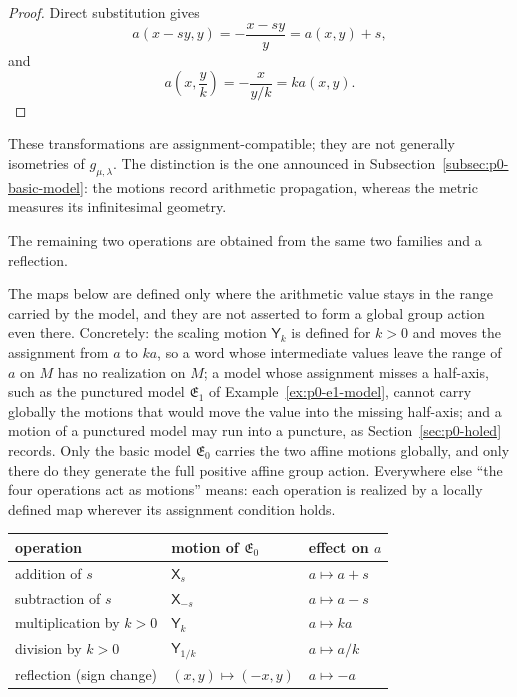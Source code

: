 \begin{proof}
Direct substitution gives
\[
  a(x-sy,y)=-\frac{x-sy}{y}=a(x,y)+s,
\]
and
\[
  a\left(x,\frac yk\right)
  =-\frac{x}{y/k}=k a(x,y).
\]
\end{proof}

These transformations are assignment-compatible; they are not generally
isometries of $g_{\mu,\lambda}$.  The distinction is the one announced in
Subsection~\ref{subsec:p0-basic-model}: the motions record arithmetic
propagation, whereas the metric measures its infinitesimal geometry.

The remaining two operations are obtained from the same two families and a
reflection.

\begin{warning}
\label{warn:p0-partial-motions}
The maps below are defined only where the arithmetic value stays in the range
carried by the model, and they are not asserted to form a global group action
even there.  Concretely: the scaling motion $\mathsf Y_k$ is defined for $k>0$
and moves the assignment from $a$ to $ka$, so a word whose intermediate values
leave the range of $a$ on $M$ has no realization on $M$; a model whose
assignment misses a half-axis, such as the punctured model
$\mathfrak E_1$ of Example~\ref{ex:p0-e1-model}, cannot carry globally the
motions that would move the value into the missing half-axis; and a motion of a
punctured model may run into a puncture, as
Section~\ref{sec:p0-holed} records.  Only the basic model
$\mathfrak E_0$ carries the two affine motions globally, and only there do they
generate the full positive affine group action.  Everywhere else ``the four
operations act as motions'' means: each operation is realized by a locally
defined map wherever its assignment condition holds.
\end{warning}

\begin{center}
\renewcommand{\arraystretch}{1.35}
\begin{tabular}{lll}
\toprule
operation & motion of $\mathfrak E_0$ & effect on $a$ \\
\midrule
addition of $s$ & $\mathsf X_s$ & $a\mapsto a+s$ \\
subtraction of $s$ & $\mathsf X_{-s}$ & $a\mapsto a-s$ \\
multiplication by $k>0$ & $\mathsf Y_k$ & $a\mapsto ka$ \\
division by $k>0$ & $\mathsf Y_{1/k}$ & $a\mapsto a/k$ \\
reflection (sign change) & $(x,y)\mapsto(-x,y)$ & $a\mapsto -a$ \\
\bottomrule
\end{tabular}
\end{center}

